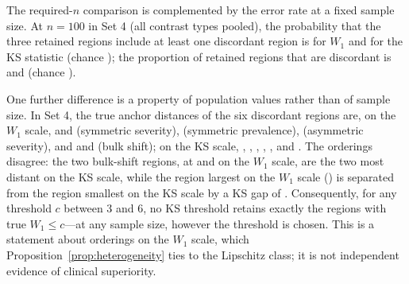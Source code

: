\documentclass[AMA,Times1COL]{WileyNJDv5}
\begin{document}
The required-$n$ comparison is complemented by the error rate at a fixed sample size. At $n = 100$ in Set 4 (all contrast types pooled), the probability that the three retained regions include at least one discordant region is  for $W_1$ and  for the KS statistic (chance ); the proportion of retained regions that are discordant is  and  (chance ).

One further difference is a property of population values rather than of sample size. In Set 4, the true anchor distances of the six discordant regions are, on the $W_1$ scale,  and  (symmetric severity),  (symmetric prevalence),  (asymmetric severity), and  and  (bulk shift); on the KS scale, , , , , , and . The orderings disagree: the two bulk-shift regions, at  and  on the $W_1$ scale, are the two most distant on the KS scale, while the region largest on the $W_1$ scale () is separated from the region smallest on the KS scale by a KS gap of . Consequently, for any threshold $c$ between 3 and 6, no KS threshold retains exactly the regions with true $W_1 \leq c$---at any sample size, however the threshold is chosen. This is a statement about orderings on the $W_1$ scale, which Proposition~\ref{prop:heterogeneity} ties to the Lipschitz class; it is not independent evidence of clinical superiority.

\end{document}
